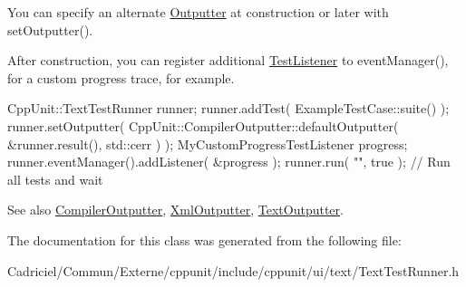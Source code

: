 You can specify an alternate \hyperlink{class_outputter}{Outputter} at construction or later with set\+Outputter().

After construction, you can register additional \hyperlink{class_test_listener}{Test\+Listener} to event\+Manager(), for a custom progress trace, for example.


\begin{DoxyCode}
CppUnit::TextTestRunner runner;
runner.addTest( ExampleTestCase::suite() );
runner.setOutputter( CppUnit::CompilerOutputter::defaultOutputter( 
                         &runner.result(),
                         std::cerr ) );
MyCustomProgressTestListener progress;
runner.eventManager().addListener( &progress );
runner.run( \textcolor{stringliteral}{""}, \textcolor{keyword}{true} );    \textcolor{comment}{// Run all tests and wait}
\end{DoxyCode}


\begin{DoxySeeAlso}{See also}
\hyperlink{class_compiler_outputter}{Compiler\+Outputter}, \hyperlink{class_xml_outputter}{Xml\+Outputter}, \hyperlink{class_text_outputter}{Text\+Outputter}. 
\end{DoxySeeAlso}


The documentation for this class was generated from the following file\+:\begin{DoxyCompactItemize}
\item 
Cadriciel/\+Commun/\+Externe/cppunit/include/cppunit/ui/text/Text\+Test\+Runner.\+h\end{DoxyCompactItemize}
